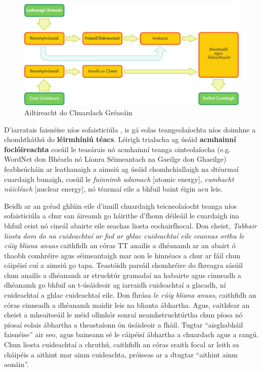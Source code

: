 \begin{multicols}{2}
\begin{figure}[htb]
  \center
  \includegraphics[width=\textwidth]{../_media/irish/web_search_architecture}
  \caption{Ailtireacht do Chuardach Gréasáin}
  \label{fig:websearcharch_de}
\end{figure}

D’iarratais faisnéise níos sofaisticiúla , is gá eolas teangeolaíochta níos doimhne a chomhtháthú do \textbf{léirmhíniú téacs}. Léirigh trialacha ag úsáid \textbf{acmhainní foclóireachta} cosúil le teasárais nó acmhainní teanga ointeolaíocha (e.g. WordNet don Bhéarla nó Líonra Séimeantach na Gaeilge don Ghaeilge) feabhsúcháin ar leathanaigh a aimsiú ag úsáid chomhchiallaigh na dtéarmaí cuardaigh bunaigh, cosúil le \textit{fuinnimh adamach} [atomic energy], \textit{cumhacht núicléach} [nuclear energy], nó téarmaí eile a bhfuil baint éigin acu leis.

Beidh ar an gcéad ghlúin eile d’innill chuardaigh teicneolaíocht teanga níos sofaisticiúla a chur san áireamh go háirithe d’fhonn déileáil le cuardaigh ina bhfuil ceist nó cineál abairte eile seachas liosta eochairfhocal. Don cheist, \textit{Tabhair liosta dom do na cuideachtaí ar fad ar ghlac cuideachtaí eile ceannas orthu le cúig bliana anuas} caithfidh an córas TT anailís a dhéanamh ar an abairt ó thaobh comhréire agus séimeantaigh mar aon le hinnéacs a chur ar fáil chun cáipéisí cuí a aimsiú go tapa. Teastóidh parsáil chomhréire do fhreagra sásúil chun anailís a dhéanamh ar struchtúr gramadaí na habairte agus cinneadh a dhéanamh go bhfuil an t-úsáideoir ag iarraidh cuideachtaí a glacadh, ní cuideachtaí a ghlac cuideachtaí eile. Don fhrása \textit{le cúig bliana anuas}, caithfidh an córas cinneadh a dhéanamh maidir leis na blianta ábhartha. Agus, caithfear an cheist a mheaitseáil le méid ollmhór sonraí neamhstruchtúrtha chun píosa nó píosaí eolais ábhartha a theastaíonn ón úsáideoir a fháil. Tugtar ``aisghabháil faisnéise'' air seo, agus baineann sé le cáipéisí ábhartha a chuardach agus a rangú. Chun liosta cuideachtaí a chruthú, caithfidh an córas sraith focal ar leith sa cháipéis a aithint mar ainm cuideachta, próiseas ar a dtugtar ``aithint ainm aonáin''.


\end{multicols}
